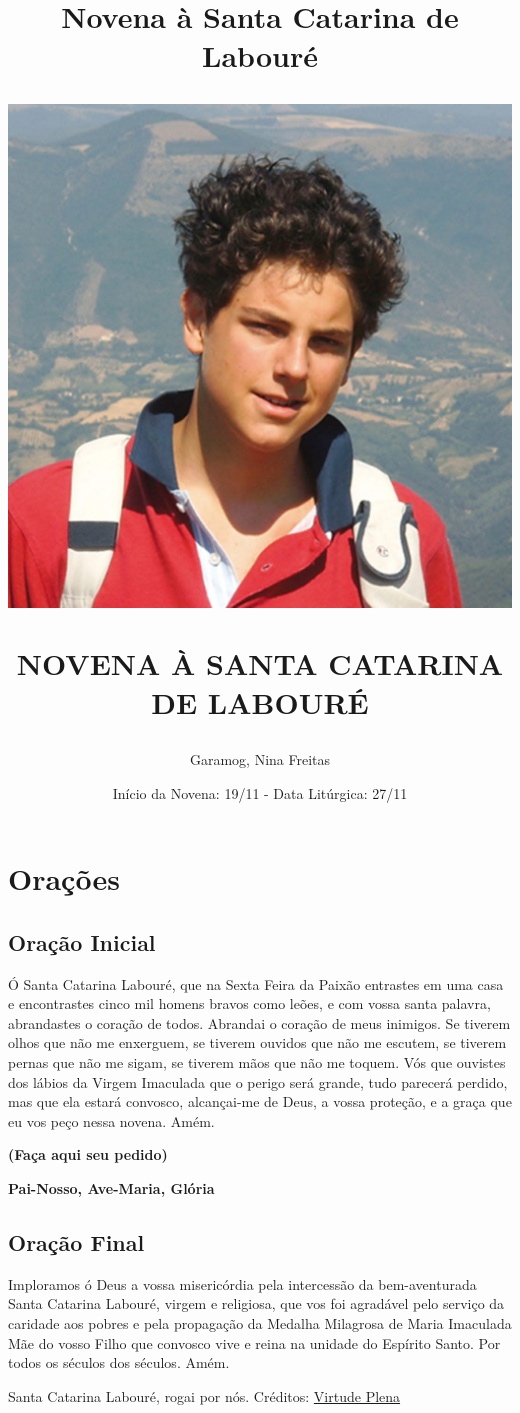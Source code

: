 \documentclass[11pt]{article}
\title{Novena à Santa Catarina de Labouré}
\title{
  \includegraphics[scale=0.5]{./assets/imagem.jpg} \par
  NOVENA À SANTA CATARINA DE LABOURÉ
}
\author{Garamog, Nina Freitas}
\date{Início da Novena: 19/11 - Data Litúrgica: 27/11}
\begin{document}
\maketitle

\pagestyle{fancy}
  
\centering

\vfill

\renewcommand{\contentsname}{Sumário}
\tableofcontents

\newpage

\section{Orações}
\subsection{Oração Inicial}

Ó Santa Catarina Labouré, que na Sexta Feira da Paixão entrastes em uma casa e encontrastes cinco mil homens bravos como leões, e com vossa santa palavra, abrandastes o coração de todos. Abrandai o coração de meus inimigos. Se tiverem olhos que não me enxerguem, se tiverem ouvidos que não me escutem, se tiverem pernas que não me sigam, se tiverem mãos que não me toquem. Vós que ouvistes dos lábios da Virgem Imaculada que o perigo será grande, tudo parecerá perdido, mas que ela estará convosco, alcançai-me de Deus, a vossa proteção, e a graça que eu vos peço nessa novena. Amém.

\textbf{(Faça aqui seu pedido)}

\textbf{Pai-Nosso, Ave-Maria, Glória}

\subsection{Oração Final} Imploramos ó Deus a vossa misericórdia pela intercessão da bem-aventurada Santa Catarina Labouré, virgem e religiosa, que vos foi agradável pelo serviço da caridade aos pobres e pela propagação da Medalha Milagrosa de Maria Imaculada Mãe do vosso Filho que convosco vive e reina na unidade do Espírito Santo. Por todos os séculos dos séculos. Amém.

Santa Catarina Labouré, rogai por nós.
\vfill 
Créditos: \href{https://www.youtube.com/watch?v=tww2pqasMts&list=PLRL6i6PPLb58c4v96NNGMqFffrI8hSo1H}{Virtude Plena}
\end{document}
